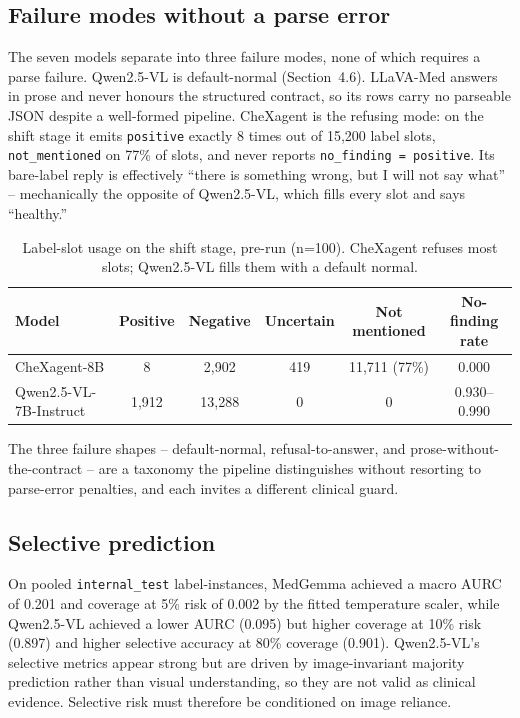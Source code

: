 \subsection{Failure modes without a parse error}

The seven models separate into three failure modes, none of which requires a
parse failure. Qwen2.5-VL is default-normal (Section~4.6). LLaVA-Med answers in
prose and never honours the structured contract, so its rows carry no parseable
JSON despite a well-formed pipeline. CheXagent is the refusing mode: on the shift
stage it emits \texttt{positive} exactly 8 times out of 15,200 label slots,
\texttt{not\_mentioned} on 77\% of slots, and never reports
\texttt{no\_finding = positive}. Its bare-label reply is effectively ``there is
something wrong, but I will not say what'' -- mechanically the opposite of
Qwen2.5-VL, which fills every slot and says ``healthy.''

\begin{table}[t]
\centering
\small
\begin{tabular}{lccccc}
\hline
Model & Positive & Negative & Uncertain & Not mentioned & No-finding rate \\
\hline
CheXagent-8B & 8 & 2{,}902 & 419 & 11{,}711 (77\%) & 0.000 \\
Qwen2.5-VL-7B-Instruct & 1{,}912 & 13{,}288 & 0 & 0 & 0.930--0.990 \\
\hline
\end{tabular}
\caption{Label-slot usage on the shift stage, pre-run (n=100). CheXagent refuses
most slots; Qwen2.5-VL fills them with a default normal.}
\label{tab:slot}
\end{table}

The three failure shapes -- default-normal, refusal-to-answer, and
prose-without-the-contract -- are a taxonomy the pipeline distinguishes without
resorting to parse-error penalties, and each invites a different clinical guard.

\subsection{Selective prediction}

On pooled \texttt{internal\_test} label-instances, MedGemma achieved a macro AURC
of 0.201 and coverage at 5\% risk of 0.002 by the fitted temperature scaler,
while Qwen2.5-VL achieved a lower AURC (0.095) but higher coverage at 10\% risk
(0.897) and higher selective accuracy at 80\% coverage (0.901). Qwen2.5-VL's
selective metrics appear strong but are driven by image-invariant majority
prediction rather than visual understanding, so they are not valid as clinical
evidence. Selective risk must therefore be conditioned on image reliance.

